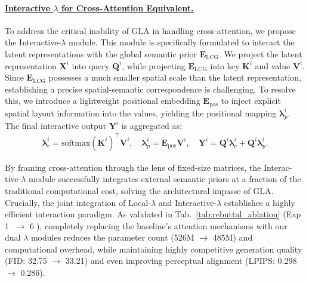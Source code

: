 \documentclass{llmxive}
\begin{document}
\paragraph{\underline{Interactive \texorpdfstring{$\lambda$}{...} for Cross-Attention Equivalent.}}
To address the critical inability of GLA in handling cross-attention, we propose the Interactive-$\lambda$ module. This module is specifically formulated to interact the latent representations with the global semantic prior $\mathbf{E}_\text{LCG}$. We project the latent representation $\mathbf{X}^i$ into query $\mathbf{Q}^i$, while projecting $\mathbf{E}_\text{LCG}$ into key $\mathbf{K}^i$ and value $\mathbf{V}^i$. 
Since $\mathbf{E}_\text{LCG}$ possesses a much smaller spatial scale than the latent representation, establishing a precise spatial-semantic correspondence is challenging. To resolve this, we introduce a lightweight positional embedding $\mathbf{E}_\text{pos}$ to inject explicit spatial layout information into the values, yielding the positional mapping $\boldsymbol{\lambda}^i_p$. The final interactive output $\mathbf{Y}^i$ is aggregated as:
\begin{equation}
\begin{gathered}
 \boldsymbol{\lambda}^i_c =  \mathrm{softmax}(\mathbf{K}^i)^\top \mathbf{V}^i, \quad
 \boldsymbol{\lambda}^i_p = \mathbf{E}_\text{pos} \mathbf{V}^i, \quad
 \mathbf{Y}^i = \mathbf{Q}^i \boldsymbol{\lambda}^i_c + \mathbf{Q}^i \boldsymbol{\lambda}^i_p.
\end{gathered}
\end{equation}

\vspace{-0.5em}
By framing cross-attention through the lens of fixed-size matrices, the Interac- tive-$\lambda$ module successfully integrates external semantic priors at a fraction of the traditional computational cost, solving the architectural impasse of GLA. Crucially, the joint integration of Local-$\lambda$ and Interactive-$\lambda$ establishes a highly efficient interaction paradigm. As validated in Tab.~\ref{tab:rebuttal_ablation} (Exp \textcircled{\small 1} $\rightarrow$ \textcircled{\small 6}), completely replacing the baseline's attention mechanisms with our dual $\lambda$ modules reduces the parameter count (526M $\rightarrow$ 485M) and computational overhead, while maintaining highly competitive generation quality (FID: 32.75 $\rightarrow$ 33.21) and even improving perceptual alignment (LPIPS: 0.298 $\rightarrow$ 0.286).

\vspace{-1em}
\end{document}
